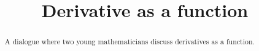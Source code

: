 \documentclass{ximera}
\title[Break-Ground:]{Derivative as a function}
\begin{document}
\begin{abstract}
A dialogue where two young mathematicians discuss derivatives as a function.
\end{abstract}
\maketitle






\end{document}
